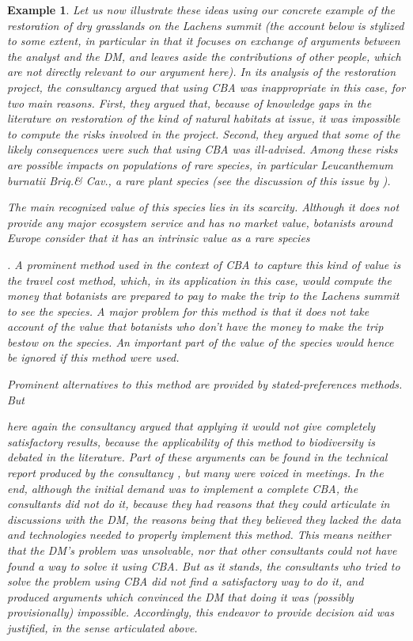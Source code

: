 \documentclass[preprint, french, english, 11pt, authoryear]{elsarticle}%
\newcommand{\ac}[1]{#1}
\newtheorem{example}{Example}
\begin{document}
\begin{example}
Let us now illustrate these ideas using our concrete example of the restoration of dry grasslands on the Lachens summit 
(the account below is stylized to some extent, in particular in that it focuses on exchange of arguments between the analyst and the \ac{DM}, and leaves aside the contributions of other people, which are not directly relevant to our argument here). 
In its analysis of the restoration project, the consultancy argued that using \ac{CBA} was inappropriate in this case, for two main reasons. 
First, they argued that, because of knowledge gaps in the literature on restoration of the kind of natural habitats at issue, it was impossible to compute the risks involved in the project. 
Second, they argued that some of the likely consequences were such that using \ac{CBA} was ill-advised.
 Among these risks are possible impacts on populations of rare species, in particular \emph{Leucanthemum burnatii} Briq.\@ \& Cav.\@, a rare plant species (see the discussion of this issue by \citet{meinard_ethical_2016}).
\begin{changebar}The main recognized value of this species lies in its scarcity. Although it does not provide any major ecosystem service and has no market value, botanists around Europe consider that it has an intrinsic value as a rare species\end{changebar}.
A prominent method used in the context of \ac{CBA} to capture this kind of value is the travel cost method, which, in its application in this case, would compute the money that botanists are prepared to pay to make the trip to the Lachens summit to see the species.
A major problem for this method is that it does not take account of the value that botanists who don't have the money to make the trip bestow on the species. An important part of the value of the species would hence be ignored if this method were used.
\begin{changebar}Prominent alternatives to this method are provided by stated-preferences methods. But\end{changebar} here again the consultancy argued that applying it would not give completely satisfactory results, because the applicability of this method to biodiversity is debated in the literature.
Part of these arguments can be found in the technical report produced by the consultancy \citep{meinard_etude_2015}, but many were voiced in meetings.
In the end, although the initial demand was to implement a complete \ac{CBA}, the consultants did not do it, because they had reasons that they could articulate in discussions with the \ac{DM}, the reasons being that they believed they lacked the data and technologies needed to properly implement this method. 
This means neither that the \ac{DM}'s problem was unsolvable, nor that other consultants could not have found a way to solve it using \ac{CBA}.
But as it stands, the consultants who tried to solve the problem using \ac{CBA} did not find a satisfactory way to do it, and produced arguments which convinced the \ac{DM} that doing it was (possibly provisionally) impossible.
Accordingly, this endeavor to provide decision aid was justified, in the sense articulated above.
\end{example}
\end{document}

